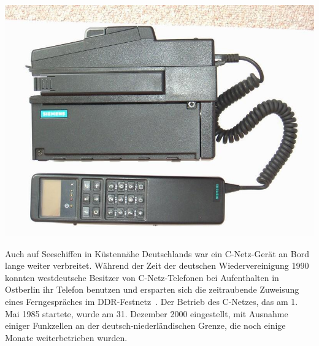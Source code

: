 \begin{multicols}{3}

\begin{Figure}
\includegraphics[width=\linewidth]{Kapitel/C-Netz/Grafiken/SiemensC1.jpg}
\label{fig:c-netz.mobiltelefonZwei}
\end{Figure}
Auch auf Seeschiffen in Küstennähe Deutschlands war ein C-Netz-Gerät an Bord lange weiter verbreitet. Während der Zeit der deutschen Wiedervereinigung 1990 konnten westdeutsche Besitzer von C-Netz-Telefonen bei Aufenthalten in Ostberlin ihr Telefon benutzen und ersparten sich die zeitraubende Zuweisung eines Ferngespräches im DDR-Festnetz~\cite{c-netz.3}.
Der Betrieb des C-Netzes, das am 1. Mai 1985 startete, wurde am 31. Dezember 2000 eingestellt, mit Ausnahme einiger Funkzellen an der deutsch-niederländischen Grenze, die noch einige Monate weiterbetrieben wurden.


\end{multicols}
